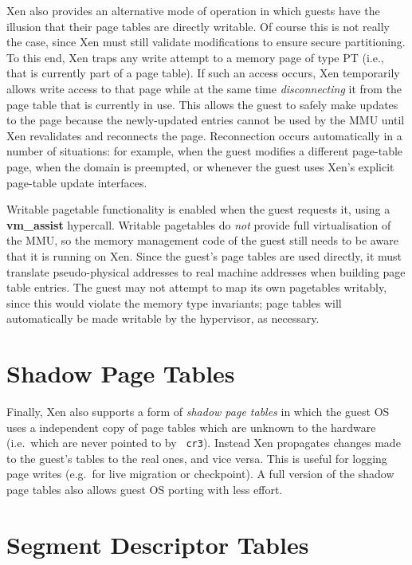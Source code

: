 \documentclass[11pt,twoside,final,openright,a4paper]{report}
\begin{document}
Xen also provides an alternative mode of operation in which guests
have the illusion that their page tables are directly writable.  Of
course this is not really the case, since Xen must still validate
modifications to ensure secure partitioning. To this end, Xen traps
any write attempt to a memory page of type {\sf PT} (i.e., that is
currently part of a page table).  If such an access occurs, Xen
temporarily allows write access to that page while at the same time
\emph{disconnecting} it from the page table that is currently in use.
This allows the guest to safely make updates to the page because the
newly-updated entries cannot be used by the MMU until Xen revalidates
and reconnects the page.  Reconnection occurs automatically in a
number of situations: for example, when the guest modifies a different
page-table page, when the domain is preempted, or whenever the guest
uses Xen's explicit page-table update interfaces.

Writable pagetable functionality is enabled when the guest requests
it, using a {\bf vm\_assist} hypercall.  Writable pagetables do {\em
not} provide full virtualisation of the MMU, so the memory management
code of the guest still needs to be aware that it is running on Xen.
Since the guest's page tables are used directly, it must translate
pseudo-physical addresses to real machine addresses when building page
table entries.  The guest may not attempt to map its own pagetables
writably, since this would violate the memory type invariants; page
tables will automatically be made writable by the hypervisor, as
necessary.

\section{Shadow Page Tables}

Finally, Xen also supports a form of \emph{shadow page tables} in
which the guest OS uses a independent copy of page tables which are
unknown to the hardware (i.e.\ which are never pointed to by {\tt
  cr3}). Instead Xen propagates changes made to the guest's tables to
the real ones, and vice versa. This is useful for logging page writes
(e.g.\ for live migration or checkpoint). A full version of the shadow
page tables also allows guest OS porting with less effort.


\section{Segment Descriptor Tables}
\end{document}
